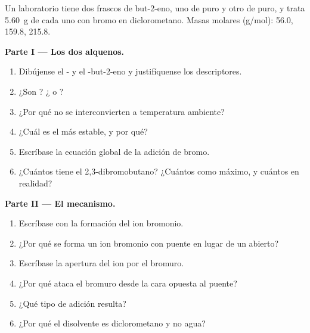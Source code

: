 \begin{problem}
\label{pb:b1:electrophilic-additions:1}
Un laboratorio tiene dos frascos de but-2-eno, uno de  puro y otro
de  puro, y trata \qty{5.60}{g} de cada uno con bromo en
diclorometano. Masas molares (\unit{g/mol}):  56.0, 
159.8,  215.8.

\medskip
\noindent\textbf{Parte I --- Los dos alquenos.}
\begin{enumerate}
  \item Dibújense el - y el -but-2-eno y justifíquense los
        descriptores.
  \item ¿Son ? ¿ o ?
  \item ¿Por qué no se interconvierten a temperatura ambiente?
  \item ¿Cuál es el más estable, y por qué?
  \item Escríbase la ecuación global de la adición de bromo.
  \item ¿Cuántos  tiene el 2,3-dibromobutano?
        ¿Cuántos  como máximo, y cuántos en realidad?
\end{enumerate}

\medskip
\noindent\textbf{Parte II --- El mecanismo.}
\begin{enumerate}[resume]
  \item Escríbase con  la formación del ion bromonio.
  \item ¿Por qué se forma un ion bromonio con puente en lugar de un
         abierto?
  \item Escríbase la apertura del ion por el bromuro.
  \item ¿Por qué ataca el bromuro desde la cara opuesta al puente?
  \item ¿Qué tipo de adición resulta?
  \item ¿Por qué el disolvente es diclorometano y no agua?
\end{enumerate}


\end{problem}
